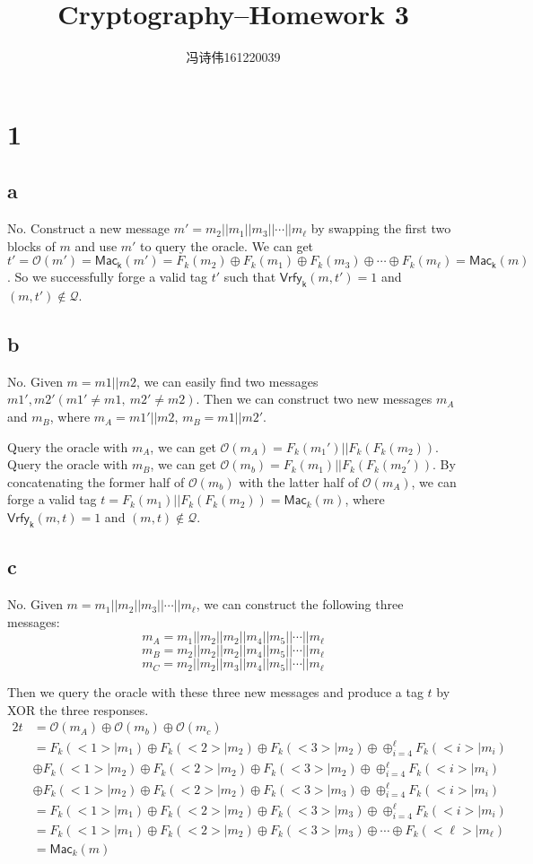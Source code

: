 \documentclass[a4papers]{ctexart}
\title{Cryptography--Homework 3}
\author{冯诗伟161220039}
\date{}
\newcommand{\mc}[1]{\mathcal{#1}}
\newcommand{\ms}[1]{\mathsf{#1}}
\begin{document}
\maketitle
\section*{1}
\subsection*{a}
No. Construct a new message $m'=m_2||m_1||m_3||\cdots||m_\ell$ by swapping the first two blocks of $m$ and use $m'$ to query the oracle.
We can get $t'=\mc{O}(m')=\ms{Mac_k}(m')=F_k(m_2)\oplus F_k(m_1)\oplus F_k(m_3)\oplus \cdots \oplus F_k(m_\ell)=\ms{Mac_k}(m)$.
So we successfully forge a valid tag $t'$ such that $\ms{Vrfy_k}(m,t')=1$ and $(m,t')\notin \mc{Q}$.

\subsection*{b}
No. Given $m=m1||m2$, we can easily find two messages $m1', m2'(m1'\ne m1,\ m2'\ne m2)$. Then we can construct two new messages $m_A$ and $m_B$, where
$m_A=m1'||m2$, $m_B=m1||m2'$. 

Query the oracle with $m_A$, we can get $\mc{O}(m_A)=F_k(m_1')||F_k(F_k(m_2))$.
Query the oracle with $m_B$, we can get $\mc{O}(m_b)=F_k(m_1)||F_k(F_k(m_2'))$.
By concatenating the former half of $\mc{O}(m_b)$ with the latter half of $\mc{O}(m_A)$, we can forge a valid tag $t=F_k(m_1)||F_k(F_k(m_2))=\ms{Mac}_k(m)$, where $\ms{Vrfy_k}(m,t)=1$ and $(m,t)\notin \mc{Q}$.

\subsection*{c}
No. Given $m=m_1||m_2||m_3||\cdots||m_\ell$, we can construct the following three messages:
\[m_A=m_1||m_2||m_2||m_4||m_5||\cdots||m_\ell\]
\[m_B=m_2||m_2||m_2||m_4||m_5||\cdots||m_\ell\]
\[m_C=m_2||m_2||m_3||m_4||m_5||\cdots||m_\ell\]

Then we query the oracle with these three new messages and produce a tag $t$ by 
XOR the three responses.
\begin{alignat*}{2}
    t &= \mc{O}(m_A)\oplus \mc{O}(m_b)\oplus \mc{O}(m_c)\\
    &= F_k(<1>|m_1)\oplus F_k(<2>|m_2)\oplus F_k(<3>|m_2)\oplus \oplus^{\ell}_{i=4} F_k(<i>|m_i)\\
    &\oplus  F_k(<1>|m_2)\oplus F_k(<2>|m_2)\oplus F_k(<3>|m_2)\oplus \oplus^{\ell}_{i=4} F_k(<i>|m_i)\\
    &\oplus  F_k(<1>|m_2)\oplus F_k(<2>|m_2)\oplus F_k(<3>|m_3)\oplus \oplus^{\ell}_{i=4} F_k(<i>|m_i)\\
    &= F_k(<1>|m_1)\oplus F_k(<2>|m_2)\oplus F_k(<3>|m_3)\oplus \oplus^{\ell}_{i=4} F_k(<i>|m_i)\\
    &= F_k(<1>|m_1)\oplus F_k(<2>|m_2)\oplus F_k(<3>|m_3)\oplus \cdots \oplus F_k(<\ell>|m_\ell)\\
    &= \ms{Mac}_k(m)
\end{alignat*}
\end{document}
